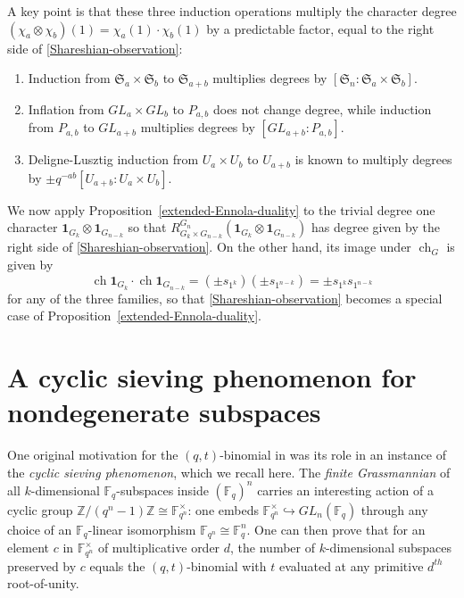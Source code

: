 \documentclass[10pt]{amsart}
\theoremstyle{plain}
\theoremstyle{definition}
\theoremstyle{remark}
\numberwithin{equation}{section}
\newcommand\triv{\mathbf{1}}
\newcommand\ch{\operatorname{ch}}
\newcommand\FF{\mathbb{F}}
\newcommand\ZZ{\mathbb{Z}}
\newcommand\symm{\mathfrak{S}}
\begin{document}
\noindent
A key point is that these three induction operations multiply
the character degree $(\chi_a \otimes \chi_b)(1)=\chi_a(1) \cdot \chi_b(1)$
by a predictable factor, equal to the right side of \eqref{Shareshian-observation}:
\begin{enumerate}  
\item[$\bullet$]
Induction from $\symm_a \times \symm_b$ to $\symm_{a+b}$ multiplies
degrees by $[\symm_n:\symm_a \times \symm_b]$.
\item[$\bullet$]
Inflation from $GL_a \times GL_b$ to $P_{a,b}$ does
not change degree, while induction from $P_{a,b}$ to $GL_{a+b}$
multiplies degrees by $[GL_{a+b}:P_{a,b}]$.
\item[$\bullet$]
Deligne-Lusztig induction from $U_a \times U_b$ to $U_{a+b}$ 
is known \cite[Proposition 12.17]{DigneMichel}
to multiply degrees by $\pm q^{-ab}[U_{a+b}:U_a \times U_b]$.
\end{enumerate}

We now apply Proposition~\ref{extended-Ennola-duality}
to the trivial degree one character 
$
\triv_{G_k} \otimes \triv_{G_{n-k}}
$
so that
$
R^{G_{n}}_{G_k \times G_{n-k}} 
\left( \triv_{G_k} \otimes \triv_{G_{n-k}} \right)
$
has degree given by the right side of \eqref{Shareshian-observation}.
On the other hand, its image under $\ch_G$ is given by 
$$
\ch \triv_{G_k} \cdot \ch \triv_{G_{n-k}}
=\left( \pm s_{1^k} \right) \left( \pm s_{1^{n-k}} \right)
=\pm s_{1^k} s_{1^{n-k}}
$$
for any of the three families, so that
\eqref{Shareshian-observation} becomes 
a special case of Proposition~\ref{extended-Ennola-duality}.











\section{A cyclic sieving phenomenon for nondegenerate subspaces}
\label{CSP-section}



One original motivation for the
$(q,t)$-binomial in \cite{RSW} was its role in an instance 
of the {\it cyclic sieving phenomenon}, which we recall here.
The {\it finite Grassmannian} of all $k$-dimensional $\FF_q$-subspaces
inside $(\FF_q)^n$ carries an interesting action of a cyclic group
$\ZZ/(q^n-1)\ZZ \cong \FF_{q^n}^\times$:  one embeds
$\FF_{q^n}^\times \hookrightarrow GL_n(\FF_q)$ through any
choice of an $\FF_q$-linear isomorphism $\FF_{q^n} \cong \FF_q^n$.
One can then prove \cite[Theorem 9.4]{RSW} that for an element 
$c$ in $\FF_{q^n}^\times$ of multiplicative
order $d$, the number of $k$-dimensional subspaces preserved by $c$ equals
the $(q,t)$-binomial with $t$ evaluated at any primitive
$d^{th}$ root-of-unity.
\end{document}

